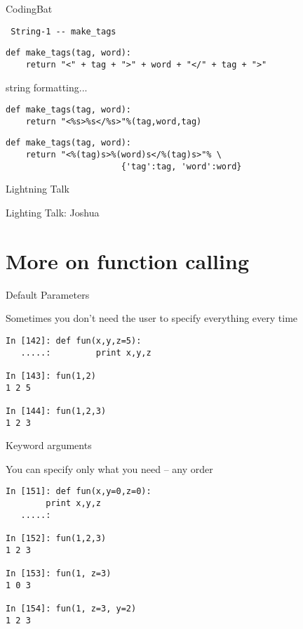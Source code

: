 \documentclass{beamer}
\begin{document}
\begin{frame}[fragile]{CodingBat}

{\Large \verb| String-1 -- make_tags|}

\begin{verbatim}
def make_tags(tag, word):
    return "<" + tag + ">" + word + "</" + tag + ">"
\end{verbatim}

{\Large string formatting...}

\begin{verbatim}
def make_tags(tag, word):
    return "<%s>%s</%s>"%(tag,word,tag)
\end{verbatim}

\begin{verbatim}
def make_tags(tag, word):
    return "<%(tag)s>%(word)s</%(tag)s>"% \
                       {'tag':tag, 'word':word}
\end{verbatim}

\end{frame} 

\begin{frame}{Lightning Talk}

{\center

\LARGE Lighting Talk:
\vfill
Joshua
\vfill

}
\end{frame}

\section{More on function calling}

\begin{frame}[fragile]{Default Parameters}

 {\Large Sometimes you don't need the user to specify everything every time}

\begin{verbatim}
In [142]: def fun(x,y,z=5):
   .....:         print x,y,z

In [143]: fun(1,2)
1 2 5

In [144]: fun(1,2,3)
1 2 3
\end{verbatim}

\end{frame} 

\begin{frame}[fragile]{Keyword arguments}

 {\Large You can specify only what you need -- any order}

\begin{verbatim}
In [151]: def fun(x,y=0,z=0):
        print x,y,z
   .....:     

In [152]: fun(1,2,3)
1 2 3

In [153]: fun(1, z=3)
1 0 3

In [154]: fun(1, z=3, y=2)
1 2 3
\end{verbatim}

\end{frame} 
\end{document}
